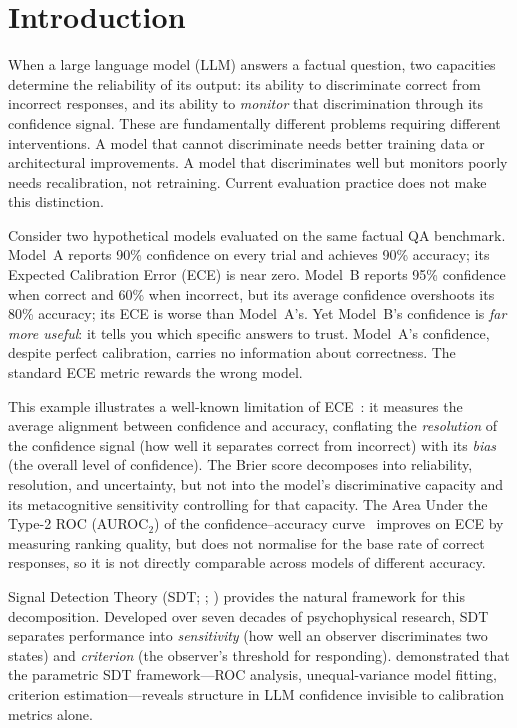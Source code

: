 \documentclass{article}
\begin{document}
\section{Introduction}

When a large language model (LLM) answers a factual question, two capacities determine the reliability of its output: its ability to discriminate correct from incorrect responses, and its ability to \emph{monitor} that discrimination through its confidence signal. These are fundamentally different problems requiring different interventions. A model that cannot discriminate needs better training data or architectural improvements. A model that discriminates well but monitors poorly needs recalibration, not retraining. Current evaluation practice does not make this distinction.

Consider two hypothetical models evaluated on the same factual QA benchmark. Model~A reports 90\% confidence on every trial and achieves 90\% accuracy; its Expected Calibration Error (ECE) is near zero. Model~B reports 95\% confidence when correct and 60\% when incorrect, but its average confidence overshoots its 80\% accuracy; its ECE is worse than Model~A's. Yet Model~B's confidence is \emph{far more useful}: it tells you which specific answers to trust. Model~A's confidence, despite perfect calibration, carries no information about correctness. The standard ECE metric rewards the wrong model.

This example illustrates a well-known limitation of ECE~\citep{guo2017calibration}: it measures the average alignment between confidence and accuracy, conflating the \emph{resolution} of the confidence signal (how well it separates correct from incorrect) with its \emph{bias} (the overall level of confidence). The Brier score decomposes into reliability, resolution, and uncertainty, but not into the model's discriminative capacity and its metacognitive sensitivity controlling for that capacity. The Area Under the Type-2 ROC (AUROC$_2$) of the confidence--accuracy curve~\citep{steyvers2025metacognition} improves on ECE by measuring ranking quality, but does not normalise for the base rate of correct responses, so it is not directly comparable across models of different accuracy.

Signal Detection Theory (SDT; \citealt{green1966signal}; \citealt{macmillan2005detection}) provides the natural framework for this decomposition. Developed over seven decades of psychophysical research, SDT separates performance into \emph{sensitivity} (how well an observer discriminates two states) and \emph{criterion} (the observer's threshold for responding). \citet{cacioli2026llms} demonstrated that the parametric SDT framework---ROC analysis, unequal-variance model fitting, criterion estimation---reveals structure in LLM confidence invisible to calibration metrics alone.
\end{document}
